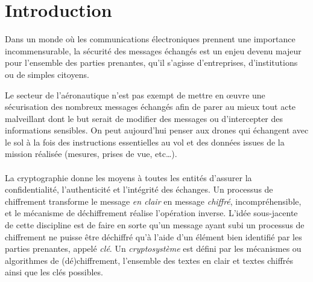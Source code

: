 
\pagebreak

\section*{Introduction}

Dans un monde où les communications électroniques prennent une importance incommensurable, la sécurité des messages échangés est un enjeu devenu majeur pour l'ensemble des parties prenantes, qu'il s'agisse d'entreprises, d'institutions ou de simples citoyens.

Le secteur de l'aéronautique n'est pas exempt de mettre en œuvre une sécurisation des nombreux messages échangés afin de parer au mieux tout acte malveillant dont le but serait de modifier des messages ou d'intercepter des informations sensibles. On peut aujourd'hui penser aux drones qui échangent avec le sol à la fois des instructions essentielles au vol et des données issues de la mission réalisée (mesures, prises de vue, etc\dots).

\paragraph{} La cryptographie donne les moyens à toutes les entités d'assurer la confidentialité, l'authenticité et l'intégrité des échanges. Un processus de chiffrement transforme le message \textit{en clair} en message \textit{chiffré}, incompréhensible, et le mécanisme de déchiffrement réalise l'opération inverse. L'idée sous-jacente de cette discipline est de faire en sorte qu'un message ayant subi un processus de chiffrement ne puisse être déchiffré qu'à l'aide d'un élément bien identifié par les parties prenantes, appelé \textit{clé}. Un \textit{cryptosystème} est défini par les mécanismes ou algorithmes de (dé)chiffrement, l'ensemble des textes en clair et textes chiffrés ainsi que les clés possibles. 
